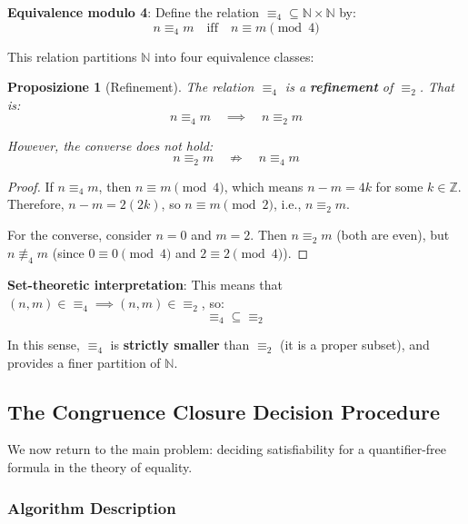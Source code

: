 \documentclass[11pt,a4paper]{article}
\theoremstyle{definition}
\theoremstyle{plain}
\newtheorem{proposition}[theorem]{Proposizione}
\theoremstyle{remark}
\newcommand{\N}{\mathbb{N}}
\begin{document}
\textbf{Equivalence modulo 4}: Define the relation $\equiv_4 \subseteq \N \times \N$ by:
\[
n \equiv_4 m \quad \text{iff} \quad n \equiv m \pmod{4}
\]

This relation partitions $\N$ into four equivalence classes:
\begin{center}
\end{center}

\begin{proposition}[Refinement]
The relation $\equiv_4$ is a \textbf{refinement} of $\equiv_2$. That is:
\[
n \equiv_4 m \quad \implies \quad n \equiv_2 m
\]

However, the converse does not hold:
\[
n \equiv_2 m \quad \not\Rightarrow \quad n \equiv_4 m
\]
\end{proposition}

\begin{proof}
If $n \equiv_4 m$, then $n \equiv m \pmod{4}$, which means $n - m = 4k$ for some $k \in \mathbb{Z}$. Therefore, $n - m = 2(2k)$, so $n \equiv m \pmod{2}$, i.e., $n \equiv_2 m$.

For the converse, consider $n = 0$ and $m = 2$. Then $n \equiv_2 m$ (both are even), but $n \not\equiv_4 m$ (since $0 \equiv 0 \pmod{4}$ and $2 \equiv 2 \pmod{4}$).
\end{proof}

\textbf{Set-theoretic interpretation}: This means that $(n, m) \in {\equiv_4} \implies (n, m) \in {\equiv_2}$, so:
\[
{\equiv_4} \subseteq {\equiv_2}
\]

In this sense, $\equiv_4$ is \textbf{strictly smaller} than $\equiv_2$ (it is a proper subset), and provides a finer partition of $\N$.

\subsection{The Congruence Closure Decision Procedure}

We now return to the main problem: deciding satisfiability for a quantifier-free formula in the theory of equality.

\subsubsection{Algorithm Description}
\end{document}
